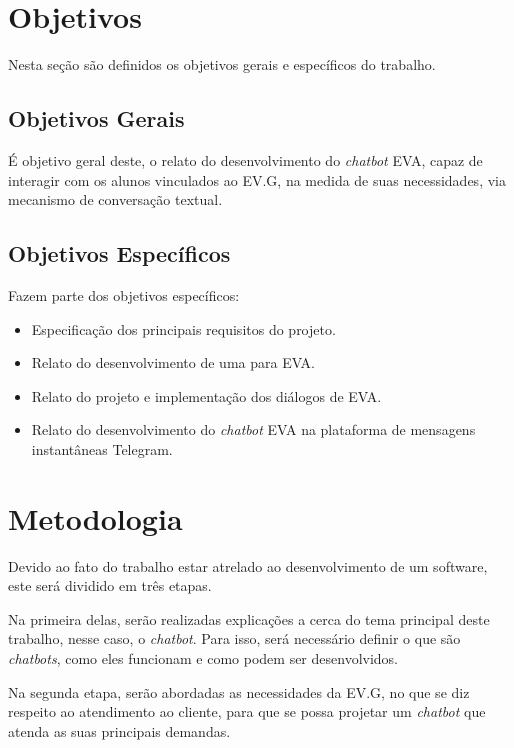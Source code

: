 \section{Objetivos}\label{cap:01:sec:01:objetivos}

Nesta seção são definidos os objetivos gerais e específicos do trabalho.


\subsection{Objetivos Gerais}\label{cap:01:sec:01:sub:01:objetivo-geral}

É objetivo geral deste, o relato do desenvolvimento do \textit{chatbot} EVA, capaz de interagir com os alunos vinculados ao EV.G, na medida de suas necessidades, via mecanismo de conversação textual.


\subsection{Objetivos Específicos}\label{cap:01:sec:01:sub:02:ojetivos-especificos}

Fazem parte dos objetivos específicos:

\begin{itemize}
    \item Especificação dos principais requisitos do projeto.
    \item Relato do desenvolvimento de uma  para EVA.
    \item Relato do projeto e implementação dos diálogos de EVA.
    \item Relato do desenvolvimento do \textit{chatbot} EVA na plataforma de mensagens instantâneas Telegram.
\end{itemize}


\section{Metodologia}\label{cap:01:sec:02:metodologia}

Devido ao fato do trabalho estar atrelado ao desenvolvimento de um software, este será dividido em três etapas. 

Na primeira delas, serão realizadas explicações a cerca do tema principal deste trabalho, nesse caso, o \textit{chatbot}. Para isso, será necessário definir o que são \textit{chatbots}, como eles funcionam e como podem ser desenvolvidos.

Na segunda etapa, serão abordadas as necessidades da EV.G, no que se diz respeito ao atendimento ao cliente, para que se possa projetar um \textit{chatbot} que atenda as suas principais demandas.


